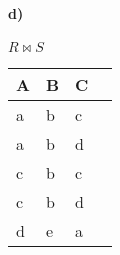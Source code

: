 \begin{multicols}{4}
\columnbreak
\paragraph{d)} $R\bowtie S$

\hspace*{0.063cm}
\begin{tabular}{| l | l | l | l |}
	\hline
	\rowcolor{TableHeader}\textbf{A} &  \textbf{B} &   \textbf{C}\\
	\hline
	a & b & c \\
	\hline
	a & b & d \\
	\hline
	c & b & c \\
	\hline
	c & b & d\\
	\hline
	d & e & a\\
	\hline
\end{tabular}
\end{multicols}

